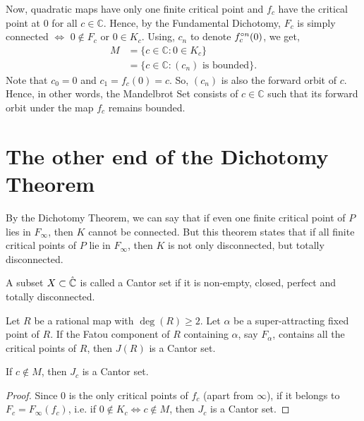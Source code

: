 Now, quadratic maps have only one finite critical point and \( f_c \) have the critical point at \( 0 \) for all \( c\in \mathbb{C} \).
Hence, by the Fundamental Dichotomy, \( F_c \) is simply connected \( \iff \) \( 0\not\in F_c \) or \( 0\in K_c \). Using, \( c_n \) to denote \( \fcof[n](0) \),
we get,
\begin{align*}
	M&=\{c\in \mathbb{C}:0\in K_c\}\\
	 &=\{c\in \mathbb{C}:(c_n)\text{ is bounded}\}
.\end{align*}
Note that \( c_0=0 \) and \( c_1=f_c(0)=c \). So, \( (c_n) \) is also the forward orbit of \( c \). Hence, in other words,
the Mandelbrot Set consists of \( c\in \mathbb{C} \) such that its forward orbit under the map \( f_c \)
remains bounded.

\section{The other end of the Dichotomy Theorem}
By the Dichotomy Theorem, we can say that if even one finite critical point of \( P \) lies in \( F_\infty \), then \( K \)
cannot be connected. But this theorem states that if all finite critical points of \( P \) lie in \( F_\infty \), then
\( K \) is not only disconnected, but totally disconnected.

\begin{definition}
	A subset \( X\subset \hat{\mathbb{C}} \) is called a Cantor set if it is non-empty, closed, perfect and totally disconnected.
\end{definition}

\begin{theorem}
	Let \( R \) be a rational map with \( \deg(R)\ge 2 \). Let \( \alpha \) be a super-attracting fixed
	point of \( R \). If the Fatou component of \( R \) containing \( \alpha \), say \( F_\alpha \),
	contains all the critical points of \( R \), then \( J(R) \) is a Cantor set.
\end{theorem}

\begin{corollary}
	If \( c\not\in M \), then \( J_c \) is a Cantor set.
\end{corollary}
\begin{proof}
	Since \( 0 \) is the only critical points of \( f_c \) (apart from \( \infty \)), if it belongs to \( F_c=F_\infty(f_c) \), 
	i.e. if \( 0\not\in K_c \iff c\not\in M \), then \( J_c \) is a Cantor set.
\end{proof}

